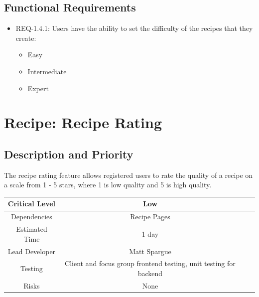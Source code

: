 \documentclass{scrreprt}
\begin{document}
\subsection{\gls{Functional Requirements}}

\begin{itemize}
    \item REQ-1.4.1: Users have the ability to set the difficulty of the recipes that they create:
        \begin{itemize}
            \item Easy
            \item Intermediate
            \item Expert
        \end{itemize}
\end{itemize}

\section{Recipe: Recipe Rating}

\subsection{Description and Priority}

The recipe rating feature allows registered users to rate the quality of a recipe on a scale from 1 - 5 stars, where 1 is low quality and 5 is high quality.

\begin{center}
    \begin{tabular}{| c | c | c | c |}
        \hline
        Critical Level & Low                                                               \\
        \hline
        Dependencies   & Recipe Pages                                                      \\
        \hline
        Estimated Time & 1 day                                                             \\
        \hline
        Lead Developer & Matt Spargue                                                    \\
        \hline
        Testing         & Client and focus group \gls{frontend} testing,
                          \gls{unit testing} for \gls{backend}                             \\
        \hline
        Risks          & None                                                              \\
        \hline
    \end{tabular}
\end{center}
\end{document}
